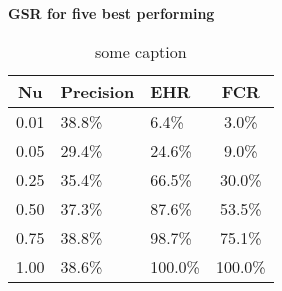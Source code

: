 \begin{table}[h]
  \centering
  \textbf{GSR for five best performing}\vspace{2pt}
  \begin{tabularx}{\columnwidth}{cXXc}
    \toprule
    \textbf{Nu} & \textbf{Precision} & \textbf{EHR} & \textbf{FCR} \\
    \midrule
    0.01        & 38.8\%             & 6.4\%        & 3.0\%        \\ \hline
    0.05        & 29.4\%             & 24.6\%       & 9.0\%        \\ \hline
    0.25        & 35.4\%             & 66.5\%       & 30.0\%       \\ \hline
    0.50        & 37.3\%             & 87.6\%       & 53.5\%       \\ \hline
    0.75        & 38.8\%             & 98.7\%       & 75.1\%       \\ \hline
    1.00        & 38.6\%             & 100.0\%      & 100.0\%      \\ \hline
    \bottomrule
  \end{tabularx}
  \caption{some caption}
\end{table}